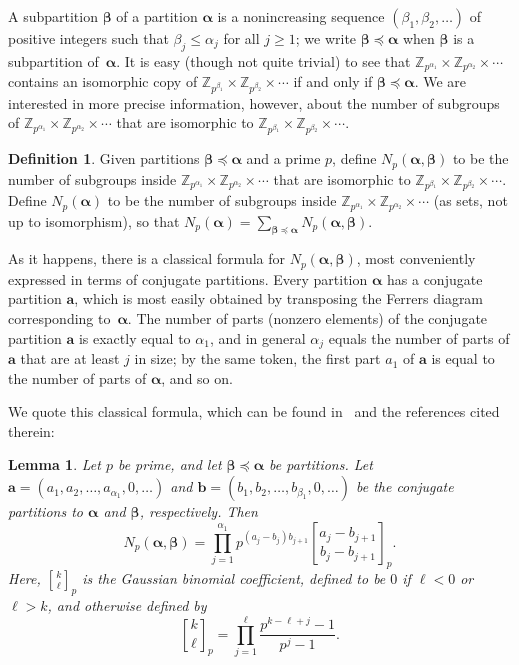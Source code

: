 \documentclass[12pt,reqno]{amsart}
\newtheorem{lemma}[theorem]{Lemma}
\theoremstyle{definition}
\newtheorem{definition}[theorem]{Definition}
\newcommand{\gbinom}[2]{\genfrac{[}{]}{0pt}{}{#1}{#2}}
\newcommand{\Z}{{\mathbb Z}}
\newcommand{\ba}{{\bm a}}
\newcommand{\bb}{{\bm b}}
\newcommand{\balpha}{{\bm\alpha}}
\newcommand{\bbeta}{{\bm\beta}}
\begin{document}
A subpartition $\bbeta$ of a partition $\balpha$ is a nonincreasing sequence $(\beta_1,\beta_2,\dots)$ of positive integers such that $\beta_j \le \alpha_j$ for all $j\ge1$; we write $\bbeta \preceq \balpha$ when $\bbeta$ is a subpartition of~$\balpha$. It is easy (though not quite trivial) to see that $\Z_{p^{\alpha_1}} \times \Z_{p^{\alpha_2}} \times \cdots$ contains an isomorphic copy of $\Z_{p^{\beta_1}} \times \Z_{p^{\beta_2}} \times \cdots$ if and only if $\bbeta \preceq \balpha$. We are interested in more precise information, however, about the number of subgroups of $\Z_{p^{\alpha_1}} \times \Z_{p^{\alpha_2}} \times \cdots$ that are isomorphic to $\Z_{p^{\beta_1}} \times \Z_{p^{\beta_2}} \times \cdots$.

\begin{definition}
Given partitions $\bbeta \preceq \balpha$ and a prime $p$, define $N_p(\balpha,\bbeta)$ to be the number of subgroups inside $\Z_{p^{\alpha_1}} \times \Z_{p^{\alpha_2}} \times \cdots$ that are isomorphic to $\Z_{p^{\beta_1}} \times \Z_{p^{\beta_2}} \times \cdots$. Define $N_p(\balpha)$ to be the number of subgroups inside $\Z_{p^{\alpha_1}} \times \Z_{p^{\alpha_2}} \times \cdots$ (as sets, not up to isomorphism), so that $N_p(\balpha) = \sum_{\bbeta \preceq \balpha} N_p(\balpha,\bbeta)$.
\end{definition}

As it happens, there is a classical formula for $N_p(\balpha,\bbeta)$, most conveniently expressed in terms of conjugate partitions.
Every partition $\balpha$ has a conjugate partition $\ba$, which is most easily obtained by transposing the Ferrers diagram corresponding to~$\balpha$. The number of parts (nonzero elements) of the conjugate partition $\ba$ is exactly equal to $\alpha_1$, and in general $\alpha_j$ equals the number of parts of $\ba$ that are at least $j$ in size; by the same token, the first part $a_1$ of $\ba$ is equal to the number of parts of $\balpha$, and so on.

We quote this classical formula, which can be found in~\cite[equation (1)]{ste92} and the references cited therein:

\begin{lemma}
\label{quoting number of subgroups lemma}
Let $p$ be prime, and let $\bbeta \preceq \balpha$ be partitions. Let $\ba = (a_1,a_2,\dots,a_{\alpha_1},0,\dots)$ and $\bb = (b_1,b_2,\dots,b_{\beta_1},0,\dots)$ be the conjugate partitions to $\balpha$ and $\bbeta$, respectively. Then
\[
N_p(\balpha,\bbeta) = \prod_{j=1}^{\alpha_1} p^{(a_j-b_j)b_{j+1}} \gbinom{a_j-b_{j+1}}{b_j-b_{j+1}}_p.
\]
Here, $\gbinom k\ell_p$ is the Gaussian binomial coefficient, defined to be $0$ if $\ell<0$ or $\ell>k$, and otherwise defined by
\begin{equation}  \label{Gauss binom def}
\gbinom k\ell_p = \prod_{j=1}^\ell \frac{p^{k-\ell+j}-1}{p^j-1}.
\end{equation}
\end{lemma}
\end{document}
